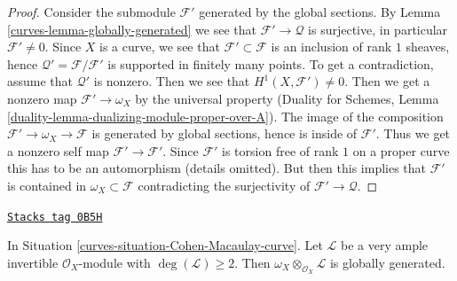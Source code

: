 \begin{proof}

Consider the submodule $\mathcal{F}'$ generated by the global sections. By
Lemma \ref{curves-lemma-globally-generated} we see that $\mathcal{F}' \to \mathcal{Q}$
is surjective, in particular $\mathcal{F}' \not = 0$. Since $X$ is a curve, we
see that $\mathcal{F}' \subset \mathcal{F}$ is an inclusion of rank $1$
sheaves, hence $\mathcal{Q}' = \mathcal{F}/\mathcal{F}'$ is supported in
finitely many points. To get a contradiction, assume that
$\mathcal{Q}'$ is nonzero. Then we see that $H^1(X, \mathcal{F}') \not = 0$.
Then we get a nonzero map $\mathcal{F}' \to \omega_X$ by the universal
property (Duality for Schemes, Lemma
\ref{duality-lemma-dualizing-module-proper-over-A}).
The image of the composition $\mathcal{F}' \to \omega_X \to \mathcal{F}$
is generated by global sections, hence is inside of $\mathcal{F}'$.
Thus we get a nonzero self map $\mathcal{F}' \to \mathcal{F}'$.
Since $\mathcal{F}'$ is torsion free of rank $1$ on a proper curve
this has to be an automorphism (details omitted). But then this implies that
$\mathcal{F}'$ is contained in $\omega_X \subset \mathcal{F}$
contradicting the surjectivity of $\mathcal{F}' \to \mathcal{Q}$.
\end{proof}

\begin{lemma}
\label{curves-lemma-tensor-omega-with-globally-generated-invertible}
\href{https://stacks.math.columbia.edu/tag/0B5H}{\texttt{Stacks tag 0B5H}}

In Situation \ref{curves-situation-Cohen-Macaulay-curve}. Let $\mathcal{L}$
be a very ample invertible $\mathcal{O}_X$-module with
$\deg(\mathcal{L}) \geq 2$. Then
$\omega_X \otimes_{\mathcal{O}_X} \mathcal{L}$ is globally generated.
\end{lemma}

